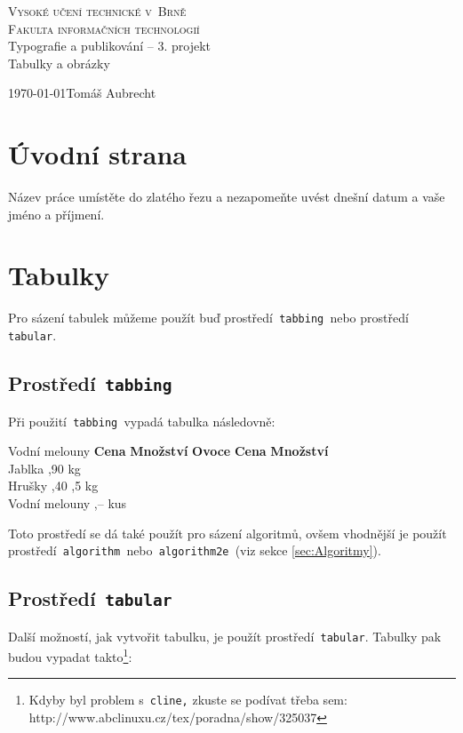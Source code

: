 \documentclass[a4paper, 11pt]{article}
\begin{document}
	\begin{titlepage}
	\begin{center}
			{\Huge\textsc{Vysoké učení technické v~Brně}}\\
			\medskip
			{\huge\textsc{Fakulta informačních technologií}}\\
			{\LARGE
			Typografie a publikování -- 3. projekt}\\
			\medskip
			{\Huge Tabulky a obrázky}\\
	\end{center}
	{\Large \today \hfill Tomáš Aubrecht}
	\pagestyle{plain}
	\end{titlepage}



	\section{Úvodní strana}
	Název práce umístěte do zlatého řezu a nezapomeňte uvést dnešní datum a vaše jméno a příjmení.
	
	\section{Tabulky}
	Pro sázení tabulek můžeme použít buď prostředí\texttt{ tabbing }nebo prostředí\texttt{ tabular}.
	
	\subsection{Prostředí\texttt{ tabbing}}
	Při použití\texttt{ tabbing }vypadá tabulka následovně:
	
		\begin{tabbing}
			Vodní melouny \quad\= \textbf{Cena} \quad\= \textbf{Množství} \kill
			\textbf{Ovoce} \> \textbf{Cena} \> \textbf{Množství}\\
			Jablka ,90  kg\\
			Hrušky ,40 ,5 kg\\
			Vodní melouny ,--  kus\\
		\end{tabbing}
	Toto prostředí se dá také použít pro sázení algoritmů, ovšem vhodnější je použít 
	prostředí\texttt{ algorithm }nebo\texttt{ algorithm2e }(viz sekce \ref{sec:Algoritmy}).

	\subsection{Prostředí\texttt{ tabular}}
	Další možností, jak vytvořit tabulku, je použít prostředí\texttt{ tabular}. Tabulky pak 
	budou vypadat takto\footnote{Kdyby byl problem s\texttt{ cline,} zkuste se podívat třeba sem: http://www.abclinuxu.cz/tex/poradna/show/325037}: \\
		
\end{document}
